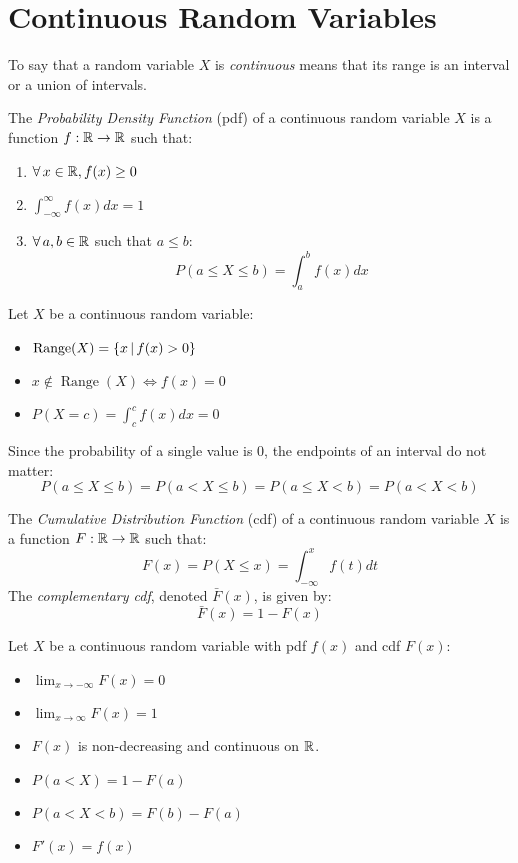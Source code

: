 \documentclass[letterpaper,12pt,fleqn]{article}
\DeclareMathOperator{\range}{Range}
\begin{document}
\section*{Continuous Random Variables}

\begin{definition}
  To say that a random variable \(X\) is \emph{continuous} means that its range is an interval or a union of intervals.
\end{definition}

\begin{definition}
  The \emph{Probability Density Function} (pdf) of a continuous random variable \(X\) is a function \({f:\mathbb{R}\to\mathbb{R}}\) such that:
  \begin{enumerate}
  \item \(\forall\,x\in\mathbb{R}, f(x)\ge0\)
  \item \(\displaystyle\int_{-\infty}^{\infty}f(x)dx=1\)
  \item \(\forall\,a,b\in\mathbb{R}\) such that \(a\le b\):
    \[P(a\le X\le b)=\int_a^bf(x)dx\]
  \end{enumerate}
\end{definition}

\begin{properties}
  Let \(X\) be a continuous random variable:
  \begin{itemize}
  \item \(\range(X)=\setb{x}{f(x)>0}\)
  \item \(x\notin\range(X)\iff f(x)=0\)
  \item \(P(X=c)=\int_c^cf(x)dx=0\)
  \end{itemize}
\end{properties}
Since the probability of a single value is 0, the endpoints of an interval do not matter:
\[P(a\le X\le b)=P(a<X\le b)=P(a\le X<b)=P(a<X<b)\]

\begin{definition}
  The \emph{Cumulative Distribution Function} (cdf) of a continuous random variable \(X\) is a function \({F:\mathbb{R}\to\mathbb{R}}\) such
  that:
  \[F(x)=P(X\le x)=\int_{-\infty}^xf(t)dt\]
  The \emph{complementary cdf}, denoted \(\bar{F}(x)\), is given by:
  \[\bar{F}(x)=1-F(x)\]
\end{definition}

\begin{properties}
  Let \(X\) be a continuous random variable with pdf \(f(x)\) and cdf \(F(x)\):
  \begin{itemize}
  \item \(\displaystyle\lim_{x\to-\infty}F(x)=0\)
  \item \(\displaystyle\lim_{x\to\infty}F(x)=1\)
  \item \(F(x)\) is non-decreasing and continuous on \(\mathbb{R}\).
  \item \(P(a<X)=1-F(a)\)
  \item \(P(a<X<b)=F(b)-F(a)\)
  \item \(F'(x)=f(x)\)
  \end{itemize}
\end{properties}
\end{document}
